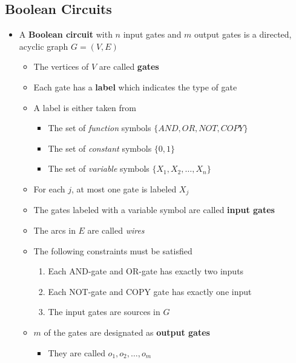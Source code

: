 \documentclass[11pt]{article}
\begin{document}
\subsection{Boolean Circuits}
\label{sec:orga6128eb}
\begin{itemize}
\item A \textbf{Boolean circuit} with \(n\) input gates and \(m\) output gates is a directed, acyclic graph \(G=(V,E)\)
\begin{itemize}
\item The vertices of \(V\) are called \textbf{gates}
\item Each gate has a \textbf{label} which indicates the type of gate
\item A label is either taken from
\begin{itemize}
\item The set of \emph{function} symbols \(\{AND, OR, NOT, COPY\}\)
\item The set of \emph{constant} symbols \(\{0,1\}\)
\item The set of \emph{variable} symbols \(\{X_1, X_2, \dots, X_n\}\)
\end{itemize}
\item For each \(j\), at most one gate is labeled \(X_j\)
\item The gates labeled with a variable symbol are called \textbf{input gates}
\item The arcs in \(E\) are called \emph{wires}
\item The following constraints must be satisfied
\begin{enumerate}
\item Each AND-gate and OR-gate has exactly two inputs
\item Each NOT-gate and COPY gate has exactly one input
\item The input gates are sources in \(G\)
\end{enumerate}
\item \(m\) of the gates are designated as \textbf{output gates}
\begin{itemize}
\item They are called \(o_1, o_2, \dots, o_m\)
\end{itemize}
\end{itemize}


\end{itemize}
\end{document}

